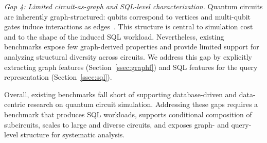 \emph{Gap 4: Limited circuit-as-graph and SQL-level characterization.}
Quantum circuits are inherently graph-structured: qubits correspond to vertices and multi-qubit gates induce
interactions as edges~\cite{Markov+2008}. This structure is central to simulation cost and to the shape of the induced SQL 
workload. Nevertheless, existing benchmarks expose few graph-derived properties and provide limited support for
analyzing structural diversity across circuits.
We address this gap by explicitly extracting graph features (Section~\ref{ssec:graphf}) and
SQL features for the query representation (Section~\ref{ssec:sql}).

{}
Overall, existing benchmarks fall short of supporting database-driven and data-centric research on quantum circuit
simulation. Addressing these gaps requires a benchmark that produces SQL workloads, supports conditional
composition of subcircuits, scales to large and diverse circuits, and exposes graph- and query-level structure for
systematic analysis.
